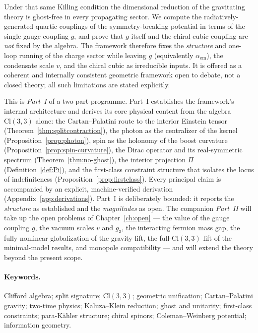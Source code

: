 \documentclass[11pt,oneside]{book}
\newcommand{\Cl}{\mathrm{Cl}}                     %
\theoremstyle{plain}
\theoremstyle{definition}
\theoremstyle{remark}
\begin{document}
Under that same Killing condition the dimensional reduction of the gravitating
theory is ghost-free in every propagating sector. We compute the
radiatively-generated quartic couplings of the symmetry-breaking potential in terms
of the single gauge coupling $g$, and prove that $g$ itself and the chiral cubic
coupling are \emph{not} fixed by the algebra. The framework therefore fixes the
\emph{structure} and one-loop running of the charge sector while leaving $g$
(equivalently $\alpha_{\mathrm{em}}$), the condensate scale $v$, and the chiral
cubic as irreducible inputs. It is offered as a coherent and internally consistent
geometric framework open to debate, not a closed theory; all such limitations are
stated explicitly.

\medskip
This is \emph{Part~I} of a two-part programme. Part~I establishes the framework's
internal architecture and derives its core physical content from the algebra
$\Cl(3,3)$ alone: the Cartan--Palatini route to the interior Einstein tensor
(Theorem~\ref{thm:splitcontraction}), the photon as the centralizer of the kernel
(Proposition~\ref{prop:photon}), spin as the holonomy of the boost curvature
(Proposition~\ref{prop:spin-curvature}), the Dirac operator and its real-symmetric
spectrum (Theorem~\ref{thm:no-ghost}), the interior projection $\Pi$
(Definition~\ref{def:Pi}), and the first-class constraint structure that isolates the
locus of indefiniteness (Proposition~\ref{prop:firstclass}). Every principal claim is
accompanied by an explicit, machine-verified derivation
(Appendix~\ref{app:derivations}). Part~I is deliberately bounded: it reports the
\emph{structure} as established and the \emph{magnitudes} as open. The companion
\emph{Part~II} will take up the open problems of Chapter~\ref{ch:open} --- the value of
the gauge coupling $g$, the vacuum scales $v$ and $g_3$, the interacting fermion mass
gap, the fully nonlinear globalization of the gravity lift, the full-$\Cl(3,3)$ lift of
the minimal-model results, and monopole compatibility --- and will extend the theory
beyond the present scope.

\paragraph{Keywords.} Clifford algebra; split signature; $\Cl(3,3)$; geometric
unification; Cartan--Palatini gravity; two-time physics; Kaluza--Klein reduction;
ghost and unitarity; first-class constraints; para-K\"ahler structure; chiral
spinors; Coleman--Weinberg potential; information geometry.
\end{document}
